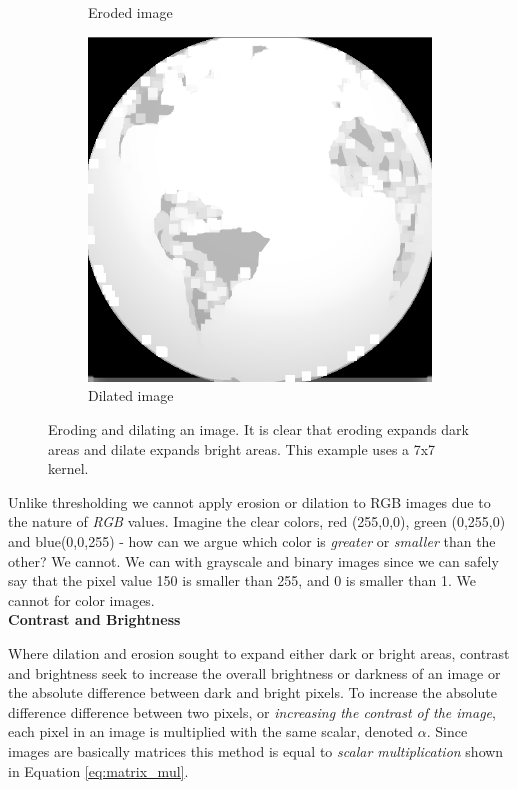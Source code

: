 \begin{figure}[!ht]
\begin{subfigure}[b]{0.3\textwidth}
                \caption{Eroded image}
        \end{subfigure}
		\quad
        \begin{subfigure}[b]{0.3\textwidth}
                \includegraphics[scale = 0.2]{img/dilate}
                \caption{Dilated image}
        \end{subfigure}
		\caption{Eroding and dilating an image. It is clear that eroding expands dark areas and dilate expands bright areas. This example uses a 7x7 kernel.}
		\label{fig:erodedilate}
\end{figure}

Unlike thresholding we cannot apply erosion or dilation to RGB images due to the nature of \textit{RGB} values. Imagine the clear colors, red (255,0,0), green (0,255,0) and blue(0,0,255) - how can we argue which color is \textit{greater} or \textit{smaller} than the other? We cannot. We can with grayscale and binary images since we can safely say that the pixel value 150 is smaller than 255, and 0 is smaller than 1. We cannot for color images. \\

\noindent \textbf{Contrast and Brightness} \par
Where dilation and erosion sought to expand either dark or bright areas, contrast and brightness seek to increase the overall brightness or darkness of an image or the absolute difference between dark and bright pixels. To increase the absolute difference difference between two pixels, or \textit{increasing the contrast of the image}, each pixel in an image is multiplied with the same scalar, denoted $\alpha$. Since images are basically matrices this method is equal to \textit{scalar multiplication} shown in Equation \ref{eq:matrix_mul}.

